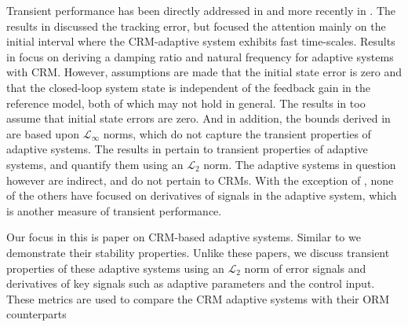 \documentclass[10pt,journal]{IEEEtran}
\theoremstyle{plain}%
\theoremstyle{definition}
\begin{document}
Transient  performance has been directly addressed in  \cite{krs93} and more recently in\cite{lav12tac,hov10,ste10,ste11} . The results in \cite{lav12tac} discussed the tracking error, but focused the attention mainly on the initial interval where the CRM-adaptive system exhibits fast time-scales. Results in \cite{ste10,ste11} focus on deriving a damping ratio and natural frequency for adaptive systems with CRM. However, assumptions are made that the initial state error is zero and that the closed-loop system state is independent of the feedback gain in the reference model, both of which may not hold in general. The results in \cite{hov10} too assume that initial state errors are zero. And in addition, the bounds derived in \cite{hov10} are based upon $\mathcal L_\infty$ norms, which do not capture the transient properties of adaptive systems. The results in \cite{krs93} pertain to transient properties of adaptive systems, and quantify them using an $\mathcal L_2$ norm. The adaptive systems in question however are indirect, and do not pertain to CRMs. With the exception of \cite{ste10,ste11}, none of the others have focused on derivatives of signals in the adaptive system, which is another measure of transient performance.


Our focus in this is paper on CRM-based adaptive systems. Similar to \cite{lav12tac,ste10,ste11} we demonstrate their stability properties. Unlike these papers, we discuss transient properties of these adaptive systems using an ${\mathcal L_2}$ norm of error signals and derivatives of key signals such as adaptive parameters and the control input. These metrics are used to compare the CRM adaptive systems with their ORM counterparts

%
\end{document}
